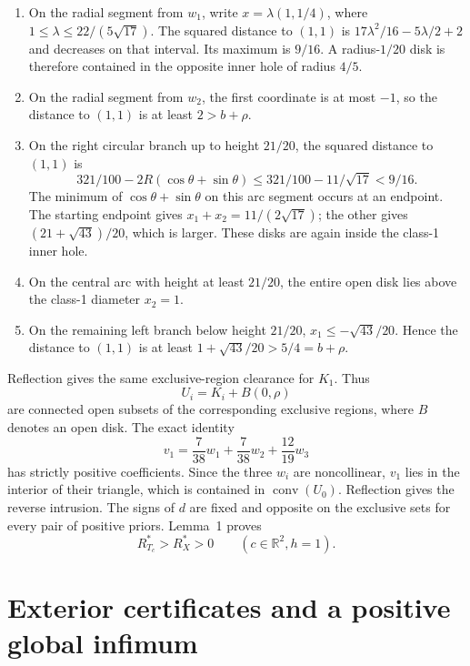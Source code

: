 \begin{enumerate}
\item On the radial segment from $w_1$, write $x=\lambda(1,1/4)$, where $1\leq\lambda\leq22/(5\sqrt{17})$. The squared distance to $(1,1)$ is $17\lambda^2/16-5\lambda/2+2$ and decreases on that interval. Its maximum is $9/16$. A radius-$1/20$ disk is therefore contained in the opposite inner hole of radius $4/5$.
\item On the radial segment from $w_2$, the first coordinate is at most $-1$, so the distance to $(1,1)$ is at least $2>b+\rho$.
\item On the right circular branch up to height $21/20$, the squared distance to $(1,1)$ is
\[
 321/100-2R(\cos\theta+\sin\theta)
 \leq321/100-11/\sqrt{17}<9/16.
\]
The minimum of $\cos\theta+\sin\theta$ on this arc segment occurs at an endpoint. The starting endpoint gives $x_1+x_2=11/(2\sqrt{17})$; the other gives $(21+\sqrt{43})/20$, which is larger. These disks are again inside the class-1 inner hole.
\item On the central arc with height at least $21/20$, the entire open disk lies above the class-1 diameter $x_2=1$.
\item On the remaining left branch below height $21/20$, $x_1\leq-\sqrt{43}/20$. Hence the distance to $(1,1)$ is at least $1+\sqrt{43}/20>5/4=b+\rho$.
\end{enumerate}
Reflection gives the same exclusive-region clearance for $K_1$. Thus
\[
 U_i=K_i+B(0,\rho)
\]
are connected open subsets of the corresponding exclusive regions, where $B$ denotes an open disk. The exact identity
\begin{equation}
 v_1=\frac7{38}w_1+\frac7{38}w_2+\frac{12}{19}w_3
 \label{supp:eq:barycentric}
\end{equation}
has strictly positive coefficients. Since the three $w_i$ are noncollinear, $v_1$ lies in the interior of their triangle, which is contained in $\operatorname{conv}(U_0)$. Reflection gives the reverse intrusion. The signs of $d$ are fixed and opposite on the exclusive sets for every pair of positive priors. Lemma~1 proves
\begin{equation}
 R^*_{T_c}>R_X^*>0\qquad(c\in\mathbb R^2, h=1).
 \label{supp:eq:overlap-result}
\end{equation}

\section{Exterior certificates and a positive global infimum}
\label{supp:exterior}

